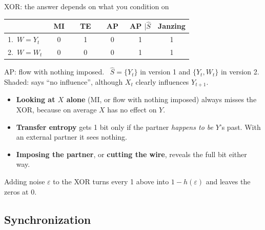 \documentclass[aspectratio=169,11pt,xcolor={table}]{beamer}
\newcommand{\Yt}{Y_t}
\newcommand{\Yn}{Y_{t+1}}
\newcommand{\flagged}[1]{\cellcolor{flag}#1}
\newcommand{\aside}[1]{{\color{muted}\small #1}}
\begin{document}
\begin{frame}{XOR: the answer depends on what you condition on}
  \centering
  \renewcommand{\arraystretch}{1.3}
  \begin{tabular}{@{}lccccc@{}}
    \toprule
    & \ MI\  & \ TE\  & \ AP\  & AP $\mid \hat S$ & Janzing \\
    \midrule
    1.\ $W = \Yt$   & \flagged{0} & 1   & \flagged{0} & 1 & 1 \\
    2.\ $W = W_t$   & \flagged{0} & \flagged{0} & \flagged{0} & 1 & 1 \\
    \bottomrule
  \end{tabular}
  \par\smallskip
  {\small\color{muted} AP: flow with nothing imposed. \ $\hat S = \{\Yt\}$ in version 1 and $\{\Yt, W_t\}$ in version 2.\\
  Shaded: says ``no influence'', although $X_t$ clearly influences $\Yn$.}
  \bigskip

  \raggedright
  \begin{itemize}
    \item \textbf{Looking at $X$ alone} (MI, or flow with nothing imposed) always misses the XOR,
      because on average $X$ has no effect on $Y$.
    \item \textbf{Transfer entropy} gets 1 bit only if the partner \emph{happens to be} $Y$'s past.
      With an external partner it sees nothing.
    \item \textbf{Imposing the partner}, or \textbf{cutting the wire}, reveals the full bit either way.
  \end{itemize}
  \aside{Adding noise $\varepsilon$ to the XOR turns every 1 above into $1 - h(\varepsilon)$ and leaves the zeros at 0.}
\end{frame}

\subsection{Synchronization}
\end{document}
